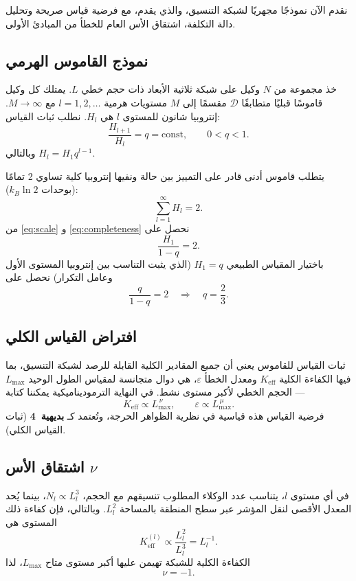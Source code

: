 \documentclass[11pt,a4paper]{article}
\newcommand{\Dir}{\mathcal{D}}
\begin{document}
	نقدم الآن نموذجًا مجهريًا لشبكة التنسيق، والذي يقدم، مع فرضية قياس صريحة وتحليل دالة التكلفة، اشتقاق الأس العام للخطأ من المبادئ الأولى.
	
	\subsection{نموذج القاموس الهرمي}
	خذ مجموعة من \(N\) وكيل على شبكة ثلاثية الأبعاد ذات حجم خطي \(L\). يمتلك كل وكيل قاموسًا قبليًا متطابقًا \(\Dir\) مقسمًا إلى \(M\) مستويات هرمية \(l = 1,2,\dots\) مع \(M \to \infty\). إنتروبيا شانون للمستوى \(l\) هي \(H_l\). نطلب ثبات القياس:
	\begin{equation}
		\frac{H_{l+1}}{H_l} = q = \text{const}, \qquad 0 < q < 1. \label{eq:scale}
	\end{equation}
	وبالتالي \(H_l = H_1 q^{l-1}\).
	
	يتطلب قاموس أدنى قادر على التمييز بين حالة ونفيها إنتروبيا كلية تساوي 2 تمامًا (بوحدات \(k_B \ln 2\)):
	\begin{equation}
		\sum_{l=1}^{\infty} H_l = 2. \label{eq:completeness}
	\end{equation}
	من \eqref{eq:scale} و \eqref{eq:completeness} نحصل على
	\[
	\frac{H_1}{1-q} = 2.
	\]
	باختيار المقياس الطبيعي \(H_1 = q\) (الذي يثبت التناسب بين إنتروبيا المستوى الأول وعامل التكرار) نحصل على
	\[
	\frac{q}{1-q} = 2 \quad\Longrightarrow\quad q = \frac{2}{3}. \label{eq:qval}
	\]
	
	\subsection{افتراض القياس الكلي}
	ثبات القياس للقاموس يعني أن جميع المقادير الكلية القابلة للرصد لشبكة التنسيق، بما فيها الكفاءة الكلية \(K_{\mathrm{eff}}\) ومعدل الخطأ \(\varepsilon\)، هي دوال متجانسة لمقياس الطول الوحيد \(L_{\max}\) — الحجم الخطي لأكبر مستوى نشط. في النهاية الترموديناميكية يمكننا كتابة
	\begin{equation}
		K_{\mathrm{eff}} \propto L_{\max}^{\,\nu}, \qquad \varepsilon \propto L_{\max}^{\,\mu}. \label{eq:scaling-assume}
	\end{equation}
	فرضية القياس هذه قياسية في نظرية الظواهر الحرجة، وتُعتمد كـ \textbf{بديهية~4} (ثبات القياس الكلي).
	
	\subsection{اشتقاق الأس \(\nu\)}
	في أي مستوى \(l\)، يتناسب عدد الوكلاء المطلوب تنسيقهم مع الحجم، \(N_l \propto L_l^3\)، بينما يُحد المعدل الأقصى لنقل المؤشر عبر سطح المنطقة بالمساحة \(L_l^2\). وبالتالي، فإن كفاءة ذلك المستوى هي
	\[
	K_{\mathrm{eff}}^{(l)} \propto \frac{L_l^2}{L_l^3} = L_l^{-1}.
	\]
	الكفاءة الكلية للشبكة تهيمن عليها أكبر مستوى متاح \(L_{\max}\)، لذا
	\[
	\nu = -1. \label{eq:nu}
	\]
	
\end{document}
